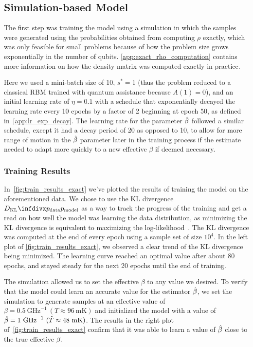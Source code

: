 \subsection{Simulation-based Model}
The first step was training the model using a simulation in which the samples were generated using the probabilities obtained from computing \( \rho \) exactly, which was only feasible for small problems because of how the problem size grows exponentially in the number of qubits.
\cref{app:exact_rho_computation} contains more information on how the density matrix was computed exactly in practice.

Here we used a mini-batch size of 10, \( s^* = 1 \) (thus the problem reduced to a classical RBM trained with quantum assistance because \( A(1) = 0 \)), and an initial learning rate of \( \eta = 0.1 \) with a schedule that exponentially decayed the learning rate every 10 epochs by a factor of 2 beginning at epoch 50, as defined in~\cref{app:lr_exp_decay}.
The learning rate for the parameter \( \hat{\beta} \) followed a similar schedule, except it had a decay period of 20 as opposed to 10, to allow for more range of motion in the \( \hat{\beta} \) parameter later in the training process if the estimate needed to adapt more quickly to a new effective \( \beta \) if deemed necessary.

\subsubsection{Training Results}
In~\cref{fig:train_results_exact} we've plotted the results of training the model on the aforementioned data.
We chose to use the KL divergence \( \DKL{\pdata}{\pmodel} \) as a way to track the progress of the training and get a read on how well the model was learning the data distribution, as minimizing the KL divergence is equivalent to maximizing the log-likelihood~\cite{murphy_2012}.
The KL divergence was computed at the end of every epoch using a sample set of size \( 10^4 \).
In the left plot of \cref{fig:train_results_exact}, we observed a clear trend of the KL divergence being minimized.
The learning curve reached an optimal value after about 80 epochs, and stayed steady for the next 20 epochs until the end of training.

The simulation allowed us to set the effective \( \beta \) to any value we desired.
To verify that the model could learn an accurate value for the estimator \( \hat{\beta} \), we set the simulation to generate samples at an effective value of \( \beta = 0.5 \ \si{\giga\hertz}^{-1} \ (T \approx 96 \ \si{\milli\kelvin}) \) and initialized the model with a value of \( \hat{\beta} = 1 \ \si{\giga\hertz}^{-1} \ (\hat{T} \approx 48 \ \si{\milli\kelvin}) \).
The results in the right plot of~\cref{fig:train_results_exact} confirm that it was able to learn a value of \( \hat{\beta} \) close to the true effective \( \beta \).

